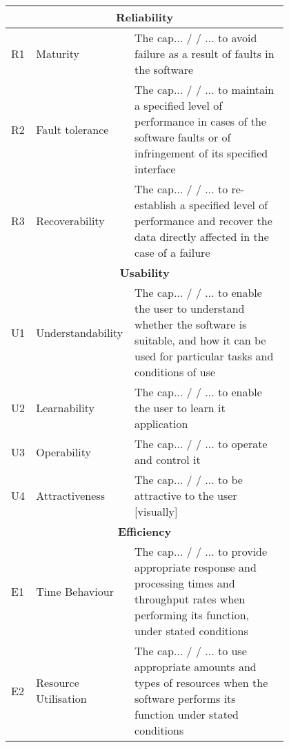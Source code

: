 \documentclass[11pt]{article}
\begin{document}
\begin{multicols}{2}
\begin{table}[]
\begin{tabular}{|p{0.05\linewidth}|p{0.2\linewidth}|p{0.55\linewidth}|}
            \multicolumn{3}{c}{\textbf{Reliability}} \\ \hline
            R1  & Maturity    & The cap... / / ... to avoid failure as a result of faults in the software \\
            \hline
            R2  &   Fault tolerance & The cap... / / ... to maintain a specified level of performance in cases of the
            software faults or of infringement of its specified interface \\ \hline
            R3  &   Recoverability  & The cap... / / ... to re-establish a specified level of performance and recover the
            data directly affected in the case of a failure \\ \hline

            \multicolumn{3}{c}{\textbf{Usability}} \\ \hline
            U1  &   Understandability   &   The cap... / / ... to enable the user to understand whether the
            software is suitable, and how it can be used for particular tasks and conditions of use \\ \hline
            U2&Learnability & The cap... / / ... to enable the user to learn it application \\ \hline
            U3&Operability & The cap... / / ... to operate and control it \\ \hline
            U4&Attractiveness& The cap... / / ... to be attractive to the user [visually] \\ \hline

            \multicolumn{3}{c}{\textbf{Efficiency}} \\ \hline
            E1&Time Behaviour & The cap... / / ... to provide appropriate response and processing times and
            throughput rates when performing its function, under stated conditions \\ \hline
            E2&Resource Utilisation & The cap... / / ... to use appropriate amounts and types of resources when the software
            performs its function under stated conditions \\ \hline
        \end{tabular}
        \end{table}


\end{multicols}
\end{document}
